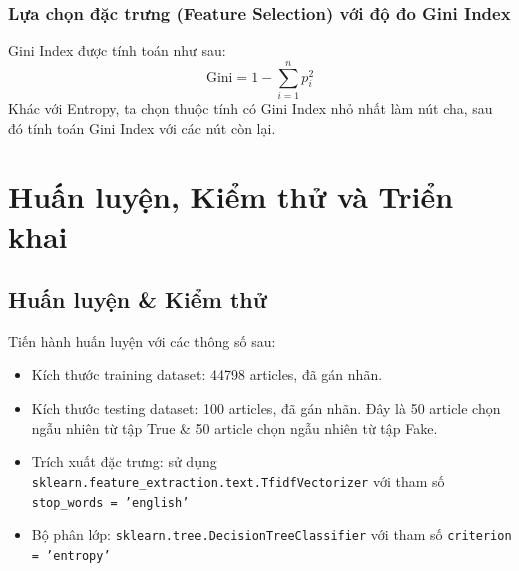 \documentclass[12pt]{article}
\begin{document}
\subsubsection{Lựa chọn đặc trưng (Feature Selection) với độ đo Gini Index}
Gini Index được tính toán như sau:
$$
\text{Gini} = 1 - \sum_{i = 1}^n p_i ^ 2
$$
Khác với Entropy, ta chọn thuộc tính có Gini Index nhỏ nhất làm nút cha, sau đó tính toán Gini Index với các nút còn lại.

\section{Huấn luyện, Kiểm thử và Triển khai}

\subsection{Huấn luyện \& Kiểm thử}
Tiến hành huấn luyện với các thông số sau:
\begin{itemize}
\item Kích thước training dataset: 44798 articles, đã gán nhãn.
\item Kích thước testing dataset: 100 articles, đã gán nhãn. Đây là 50 article chọn ngẫu nhiên từ tập True \& 50 article chọn ngẫu nhiên từ tập Fake.
\item Trích xuất đặc trưng: sử dụng \texttt{sklearn.feature\_extraction.text.TfidfVectorizer} với tham số \texttt{stop\_words = 'english'}
\item Bộ phân lớp: \texttt{sklearn.tree.DecisionTreeClassifier} với tham số \texttt{criterion = 'entropy'} 
\end{itemize}
\end{document}
